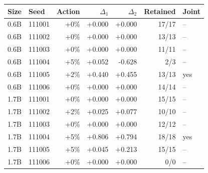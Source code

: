 \begin{tabular}{llrrrrl}\toprule
Size & Seed & Action & $\Delta_1$ & $\Delta_2$ & Retained & Joint\\\midrule
0.6B & 111001 & +0\% & +0.000 & +0.000 & 17/17 & --\\
0.6B & 111002 & +0\% & +0.000 & +0.000 & 13/13 & --\\
0.6B & 111003 & +0\% & +0.000 & +0.000 & 11/11 & --\\
0.6B & 111004 & +5\% & +0.052 & -0.628 & 2/3 & --\\
0.6B & 111005 & +2\% & +0.440 & +0.455 & 13/13 & yes\\
0.6B & 111006 & +0\% & +0.000 & +0.000 & 14/14 & --\\
1.7B & 111001 & +0\% & +0.000 & +0.000 & 15/15 & --\\
1.7B & 111002 & +2\% & +0.025 & +0.077 & 10/10 & --\\
1.7B & 111003 & +0\% & +0.000 & +0.000 & 12/12 & --\\
1.7B & 111004 & +5\% & +0.806 & +0.794 & 18/18 & yes\\
1.7B & 111005 & +5\% & +0.045 & +0.213 & 15/15 & --\\
1.7B & 111006 & +0\% & +0.000 & +0.000 & 0/0 & --\\
\bottomrule\end{tabular}
